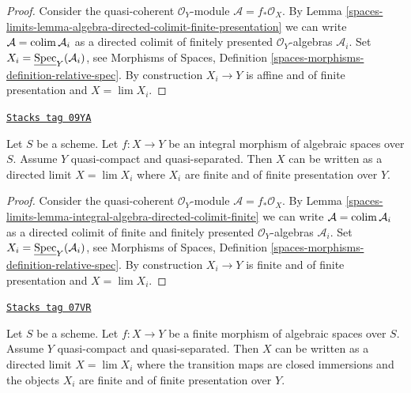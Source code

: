 \begin{proof}
Consider the quasi-coherent $\mathcal{O}_Y$-module
$\mathcal{A} = f_*\mathcal{O}_X$. By
Lemma \ref{spaces-limits-lemma-algebra-directed-colimit-finite-presentation}
we can write $\mathcal{A} = \operatorname{colim} \mathcal{A}_i$ as a directed
colimit of finitely presented
$\mathcal{O}_Y$-algebras $\mathcal{A}_i$.
Set $X_i = \underline{\operatorname{Spec}}_Y(\mathcal{A}_i)$, see
Morphisms of Spaces, Definition
\ref{spaces-morphisms-definition-relative-spec}.
By construction $X_i \to Y$ is affine and of finite presentation
and $X = \lim X_i$.
\end{proof}

\begin{lemma}
\label{spaces-limits-lemma-integral-limit-finite-and-finite-presentation}
\href{https://stacks.math.columbia.edu/tag/09YA}{\texttt{Stacks tag 09YA}}

Let $S$ be a scheme. Let $f : X \to Y$ be an integral morphism of algebraic
spaces over $S$. Assume $Y$ quasi-compact and quasi-separated.
Then $X$ can be written as a directed limit $X = \lim X_i$
where $X_i$ are finite and of finite presentation over $Y$.
\end{lemma}

\begin{proof}
Consider the quasi-coherent $\mathcal{O}_Y$-module
$\mathcal{A} = f_*\mathcal{O}_X$. By
Lemma \ref{spaces-limits-lemma-integral-algebra-directed-colimit-finite}
we can write $\mathcal{A} = \operatorname{colim} \mathcal{A}_i$ as a directed
colimit of finite and finitely presented $\mathcal{O}_Y$-algebras
$\mathcal{A}_i$.
Set $X_i = \underline{\operatorname{Spec}}_Y(\mathcal{A}_i)$, see
Morphisms of Spaces, Definition
\ref{spaces-morphisms-definition-relative-spec}.
By construction $X_i \to Y$ is finite and of finite presentation and
$X = \lim X_i$.
\end{proof}

\begin{lemma}
\label{spaces-limits-lemma-finite-in-finite-and-finite-presentation}
\href{https://stacks.math.columbia.edu/tag/07VR}{\texttt{Stacks tag 07VR}}

Let $S$ be a scheme. Let $f : X \to Y$ be a finite morphism of algebraic
spaces over $S$. Assume $Y$ quasi-compact and quasi-separated.
Then $X$ can be written as a directed limit $X = \lim X_i$
where the transition maps are closed immersions and the objects
$X_i$ are finite and of finite presentation over $Y$.
\end{lemma}

